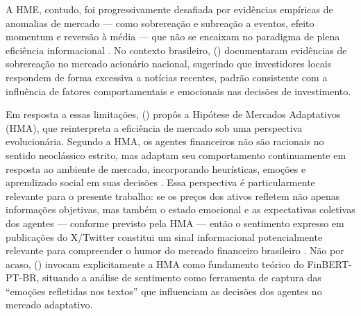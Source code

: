 A HME, contudo, foi progressivamente desafiada por evidências empíricas de anomalias de mercado --- como sobrereação e subreação a eventos, efeito momentum e reversão à média --- que não se encaixam no paradigma de plena eficiência informacional \cite{costajr1994}. No contexto brasileiro, \citeauthor{costajr1994} (\citeyear{costajr1994}) documentaram evidências de sobrereação no mercado acionário nacional, sugerindo que investidores locais respondem de forma excessiva a notícias recentes, padrão consistente com a influência de fatores comportamentais e emocionais nas decisões de investimento.

Em resposta a essas limitações, \citeauthor{lo2004} (\citeyear{lo2004,lo2005}) propôs a Hipótese de Mercados Adaptativos (HMA), que reinterpreta a eficiência de mercado sob uma perspectiva evolucionária. Segundo a HMA, os agentes financeiros não são racionais no sentido neoclássico estrito, mas adaptam seu comportamento continuamente em resposta ao ambiente de mercado, incorporando heurísticas, emoções e aprendizado social em suas decisões \cite{lo2004}. Essa perspectiva é particularmente relevante para o presente trabalho: se os preços dos ativos refletem não apenas informações objetivas, mas também o estado emocional e as expectativas coletivas dos agentes --- conforme previsto pela HMA --- então o sentimento expresso em publicações do X/Twitter constitui um sinal informacional potencialmente relevante para compreender o humor do mercado financeiro brasileiro \cite{lo2004,bollen2011,santos2023finbert}. Não por acaso, \citeauthor{santos2023finbert} (\citeyear{santos2023finbert}) invocam explicitamente a HMA como fundamento teórico do FinBERT-PT-BR, situando a análise de sentimento como ferramenta de captura das ``emoções refletidas nos textos'' que influenciam as decisões dos agentes no mercado adaptativo.